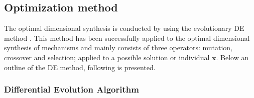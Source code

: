 \documentclass[11pt]{article}
\begin{document}
\subsection{Optimization method}
The optimal dimensional synthesis is conducted by using the evolutionary 
DE method \cite{Price_Storn2005}. This method has been successfully 
applied to the optimal dimensional synthesis of mechanisms 
\cite{Cabrera2007,Bulatovic2009,NewVillage2011,Cabrera2011} 
and mainly consists of three operators:  mutation, crossover and 
selection; applied to a possible solution or individual $\mathbf{x}$.  
Below an outline of the DE method, following  \cite{Price_Storn2005} is 
presented.

\subsubsection{Differential Evolution Algorithm}
\end{document}
